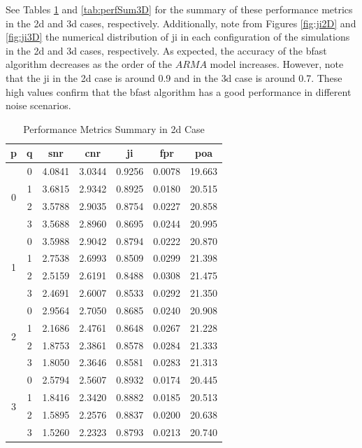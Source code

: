 See Tables \ref{tab:perfSum2D} and \ref{tab:perfSum3D} for the summary of these performance 
metrics in the \gls{2d} and \gls{3d} cases, respectively. Additionally, note from 
Figures \ref{fig:ji2D} and \ref{fig:ji3D} the numerical distribution of
\gls{ji} in each configuration of the simulations in the \gls{2d} and \gls{3d}
cases, respectively. As expected, the accuracy of the \gls{bfast} algorithm decreases 
as the order of the $ARMA$ model increases. However, note that the \gls{ji} in the \gls{2d} case
is around 0.9 and in the \gls{3d} case is around 0.7. These high values confirm that the \gls{bfast}
algorithm has a good performance in different noise scenarios.

\begin{table}[htbp!]
\centering
\caption{Performance Metrics Summary in \gls{2d} Case}
\begin{tabular}{ccccccc}
\hline
\textbf{p} & \textbf{q} & \textbf{\gls{snr}} & \textbf{\gls{cnr}} & \gls{ji} & \gls{fpr} & \gls{poa} \\ \hline
\multirow{4}{*}{0} & 0 & 4.0841 & 3.0344 & 0.9256 & 0.0078 & 19.663 \\
 & 1 & 3.6815 & 2.9342 & 0.8925 & 0.0180 & 20.515 \\
 & 2 & 3.5788 & 2.9035 & 0.8754 & 0.0227 & 20.858 \\
 & 3 & 3.5688 & 2.8960 & 0.8695 & 0.0244 & 20.995 \\ \hline
\multirow{4}{*}{1} & 0 & 3.5988 & 2.9042 & 0.8794 & 0.0222 & 20.870 \\
 & 1 & 2.7538 & 2.6993 & 0.8509 & 0.0299 & 21.398 \\
 & 2 & 2.5159 & 2.6191 & 0.8488 & 0.0308 & 21.475 \\
 & 3 & 2.4691 & 2.6007 & 0.8533 & 0.0292 & 21.350 \\ \hline
\multirow{4}{*}{2} & 0 & 2.9564 & 2.7050 & 0.8685 & 0.0240 & 20.908 \\
 & 1 & 2.1686 & 2.4761 & 0.8648 & 0.0267 & 21.228 \\
 & 2 & 1.8753 & 2.3861 & 0.8578 & 0.0284 & 21.333 \\
 & 3 & 1.8050 & 2.3646 & 0.8581 & 0.0283 & 21.313 \\ \hline
\multirow{4}{*}{3} & 0 & 2.5794 & 2.5607 & 0.8932 & 0.0174 & 20.445 \\
 & 1 & 1.8416 & 2.3420 & 0.8882 & 0.0185 & 20.513 \\
 & 2 & 1.5895 & 2.2576 & 0.8837 & 0.0200 & 20.638 \\
 & 3 & 1.5260 & 2.2323 & 0.8793 & 0.0213 & 20.740 \\ \hline
\end{tabular}
\label{tab:perfSum2D}
\end{table}

